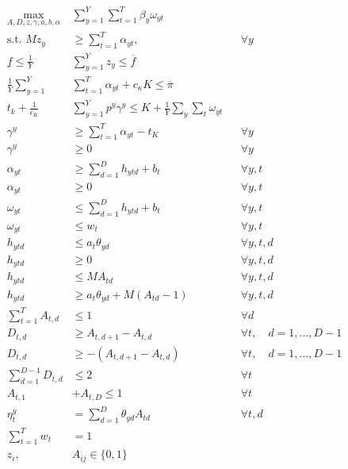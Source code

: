 \documentclass[11pt]{article}
\begin{document}
    \begin{align*}
      \max_{A,D,z,\gamma,a,b,\alpha} &\sum_{y=1}^{Y} \sum_{t=1}^{T} \beta_y \omega_{yt} \\
        \text{s.t.   } Mz_y &\geq \sum_{t=1}^{T} \alpha_{yt}, &&\forall y\\
        \underline{f} \leq \frac{1}{Y} & \sum_{y=1}^{Y} z_y \leq \overline{f}\\
        \frac{1}{Y} \sum_{y=1}^{Y} & \sum_{t=1}^{T} \alpha_{yt} + c_{\kappa}K \leq \overline{\pi}\\
        t_k + \frac{1}{\epsilon_K} &\sum_{y=1}^{Y} p^y \gamma^y \leq K + \frac{1}{Y} \sum_y \sum_t \omega_{yt}\\
        \gamma^y &\geq \sum_{t=1}^{T} \alpha_{yt} - t_K &&\forall y \\
        \gamma^y &\geq 0  &&\forall y\\
        \alpha_{yt} &\geq \sum_{d=1}^{D} h_{ytd} + b_t &&\forall y,t \\
        \alpha_{yt} &\geq 0  &&\forall y,t\\
        \omega_{yt} &\leq \sum_{d=1}^{D} h_{ytd} + b_t &&\forall y,t\\
        \omega_{yt} &\leq w_t &&\forall y,t\\
        h_{ytd} &\leq a_t \theta_{yd} &&\forall y,t,d\\
        h_{ytd} &\geq 0 &&\forall y,t,d\\
        h_{ytd} &\leq M A_{td} &&\forall y,t,d\\
        h_{ytd} &\geq a_t \theta_{yd} + M(A_{td}-1) &&\forall y,t,d\\ 
        \sum_{t=1}^{T} A_{t,d} &\leq 1 &&\forall d \\ 
        D_{t,d} &\geq A_{t,d+1}-A_{t,d} &&\forall t, \quad d=1,...,D-1\\
        D_{t,d} &\geq -(A_{t,d+1}-A_{t,d}) && \forall t, \quad d=1,...,D-1\\
        \sum_{d=1}^{D-1} D_{t,d} &\leq 2 &&\forall t \\
        A_{t,1} &+ A_{t,D} \leq 1 &&\forall t \\
        \eta_t^y &= \sum_{d=1}^{D} \theta_{yd}A_{td} &&\forall t,d \\
        \sum_{t=1}^T w_t &= 1\\
        z_i, & A_{ij} \in \{ 0,1\}
    \end{align*}
  
\end{document}
